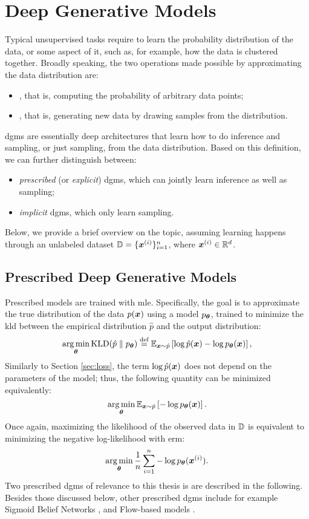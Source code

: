 \section{Deep Generative Models}\label{sec:dgm}
Typical unsupervised tasks require to learn the probability distribution of the data, or some aspect of it, such as, for example, how the data is clustered together. Broadly speaking, the two operations made possible by approximating the data distribution are:
\begin{itemize}
    \item {}, that is, computing the probability of arbitrary data points;
    \item {}, that is, generating new data by drawing samples from the distribution.
\end{itemize}
\glspl{dgm} \citep{goodfellow2016dl} are essentially deep architectures that learn how to do inference and sampling, or just sampling, from the data distribution. Based on this definition, we can further distinguish between:
\begin{itemize}
    \item \emph{prescribed} (or \emph{explicit}) \glspl{dgm}, which can jointly learn inference as well as sampling;
    \item \emph{implicit} \glspl{dgm}, which only learn sampling.
\end{itemize}
Below, we provide a brief overview on the topic, assuming learning happens through an unlabeled dataset $\Data = \{\PatternVector{x}{i}\}_{i=1}^n$, where $\PatternVector{x}{i} \in \Real^d$.

\subsection{Prescribed Deep Generative Models}\label{sec:autoregressive}
Prescribed models are trained with \gls{mle}. Specifically, the goal is to approximate the true distribution of the data $p(\Vector{x})$ using a model $p_{\boldsymbol{\theta}}$, trained to minimize the \gls{kld} between the empirical distribution $\hat{p}$ and the output distribution:
$$\argmin_{\Param} \KLD{\hat{p}}{p_{\Param}} \defeq \Expectation{\Vector{x} \sim \hat{p}}{\log \hat{p}(\Vector{x}) -\log p_{\Param}(\Vector{x})},$$
Similarly to Section \ref{sec:loss}, the term $\log \hat{p}(\Vector{x})$ does not depend on the parameters of the model; thus, the following quantity can be minimized equivalently:
$$\argmin_{\Param} \Expectation{\Vector{x} \sim \hat{p}}{-\log p_{\Param}(\Vector{x})}.$$
Once again, maximizing the likelihood of the observed data in $\mathbb{D}$ is equivalent to minimizing the negative log-likelihood with \gls{erm}:
$$\argmin_{\Param} \frac{1}{n} \sum_{i=1}^n -\log p_{\Param}(\PatternVector{x}{i}).$$
Two prescribed \glspl{dgm} of relevance to this thesis is are described in the following. Besides those discussed below, other prescribed \glspl{dgm} include for example Sigmoid Belief Networks \citep{neal1992sigmoidbeliefnet}, and Flow-based models \citep{rezende2015normalizingflows}.

